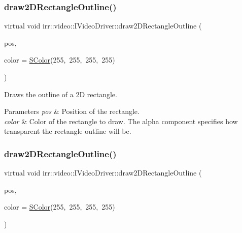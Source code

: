 \subsubsection{\texorpdfstring{draw2\+D\+Rectangle\+Outline()}{draw2DRectangleOutline()}\hspace{0.1cm}{\footnotesize\ttfamily [1/2]}}
{\footnotesize\ttfamily virtual void irr\+::video\+::\+I\+Video\+Driver\+::draw2\+D\+Rectangle\+Outline (\begin{DoxyParamCaption}\item[{const \hyperlink{namespaceirr_1_1core_a816a136b99c60f8c739005f7da7de914}{core\+::recti} \&}]{pos,  }\item[{\hyperlink{classirr_1_1video_1_1SColor}{S\+Color}}]{color = {\ttfamily \hyperlink{classirr_1_1video_1_1SColor}{S\+Color}(255,~255,~255,~255)} }\end{DoxyParamCaption})\hspace{0.3cm}{\ttfamily [pure virtual]}}



Draws the outline of a 2D rectangle. 


\begin{DoxyParams}{Parameters}
{\em pos} & Position of the rectangle. \\
\hline
{\em color} & Color of the rectangle to draw. The alpha component specifies how transparent the rectangle outline will be. \\
\hline
\end{DoxyParams}
\mbox{\label{classirr_1_1video_1_1IVideoDriver_a65efe36e19f0570988848175a8af7bd1}} 
\subsubsection{\texorpdfstring{draw2\+D\+Rectangle\+Outline()}{draw2DRectangleOutline()}\hspace{0.1cm}{\footnotesize\ttfamily [2/2]}}
{\footnotesize\ttfamily virtual void irr\+::video\+::\+I\+Video\+Driver\+::draw2\+D\+Rectangle\+Outline (\begin{DoxyParamCaption}\item[{const \hyperlink{namespaceirr_1_1core_a816a136b99c60f8c739005f7da7de914}{core\+::recti} \&}]{pos,  }\item[{\hyperlink{classirr_1_1video_1_1SColor}{S\+Color}}]{color = {\ttfamily \hyperlink{classirr_1_1video_1_1SColor}{S\+Color}(255,~255,~255,~255)} }\end{DoxyParamCaption})\hspace{0.3cm}{\ttfamily [pure virtual]}}



